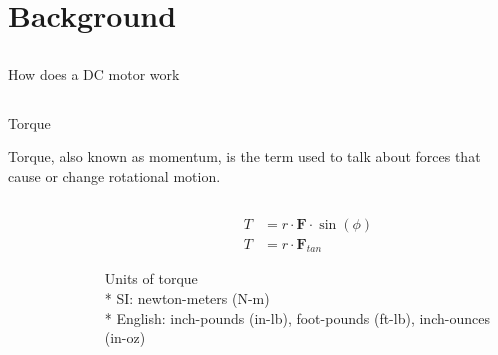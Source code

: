 \section{Background}

\subsection{}
{
\begin{frame}{How does a DC motor work}

	\vspace{-3mm}
   	\begin{figure}
 	\end{figure}



\end{frame}
}



\subsection{}
{
\begin{frame}{Torque}

Torque, also known as momentum, is the term used 
to talk about forces that cause or change rotational motion.

\begin{columns}
\begin{column}{0.5\textwidth}  %

	\vspace{-4mm}
   	\begin{figure}
 	\end{figure}

\end{column}

\begin{column}{0.5\textwidth}
\vspace{-20mm}
\begin{equation*}
\begin{split}
T & = r \cdot \mathbf{F} \cdot  \sin(\phi)  \\
T & = r \cdot \mathbf{F}_{tan} 
\end{split}
\end{equation*}


Units of torque \\
* SI: newton-meters (N-m) \\
* English: inch-pounds (in-lb), foot-pounds (ft-lb), inch-ounces (in-oz)
 
\end{column}


\end{columns}






\end{frame}
}


